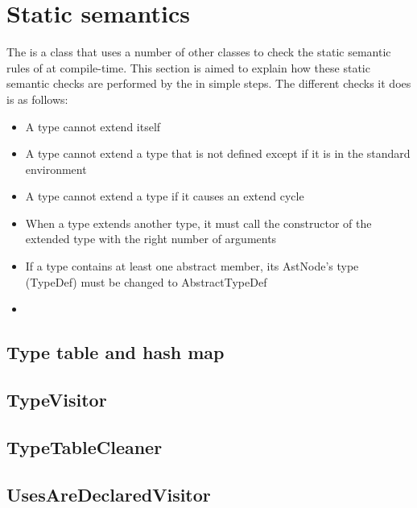\section{Static semantics}
The  is a class that uses a number of other classes to check the static semantic rules of \productname{} at compile-time. This section is aimed to explain how these static semantic checks are performed by the  in simple steps. The different checks it does is as follows:
\begin{itemize}
\item A type cannot extend itself
\item A type cannot extend a type that is not defined except if it is in the standard environment
\item A type cannot extend a type if it causes an extend cycle
\item When a type extends another type, it must call the constructor of the extended type with the right number of arguments
\item If a type contains at least one abstract member, its AstNode's type (TypeDef) must be changed to AbstractTypeDef
\item  
\end{itemize}

\subsection{Type table and hash map}

\subsection{TypeVisitor}

\subsection{TypeTableCleaner}

\subsection{UsesAreDeclaredVisitor}
